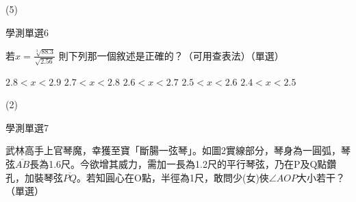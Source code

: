 \begin{QUESTIONS}
\begin{QUESTION}
        \begin{QANS}
            (5)
        \end{QANS}
        \begin{QSOLLIST}
        \end{QSOLLIST}
        \begin{QEMPTYSPACE}
        \end{QEMPTYSPACE}
    \end{QUESTION}
    \begin{QUESTION}
        \begin{ExamInfo}{83}{學測}{單選}{6}
        \end{ExamInfo}
        \begin{ExamAnsRateInfo}{}{}{}{}
        \end{ExamAnsRateInfo}
        \begin{QBODY}
            若$ x=\frac{\sqrt[3]{88.3}}{\sqrt{2.56}}$ 則下列那一個敘述是正確的？（可用查表法）（單選）
            \begin{QOPS}
            \QOP $2.8<x<2.9$	
            \QOP $2.7<x<2.8$	
            \QOP $2.6<x<2.7$
            \QOP $2.5<x<2.6$	
            \QOP $2.4<x<2.5$ 
            \end{QOPS}        
        \end{QBODY}
        \begin{QFROMS}
        \end{QFROMS}
        \begin{QTAGS}\end{QTAGS}
        \begin{QANS}
            (2)
        \end{QANS}
        \begin{QSOLLIST}
        \end{QSOLLIST}
        \begin{QEMPTYSPACE}
        \end{QEMPTYSPACE}
    \end{QUESTION}
    \begin{QUESTION}
        \begin{ExamInfo}{83}{學測}{單選}{7}
        \end{ExamInfo}
        \begin{ExamAnsRateInfo}{}{}{}{}
        \end{ExamAnsRateInfo}
        \begin{QBODY}
            武林高手上官琴魔，幸獲至寶「斷腸一弦琴」。如圖2實線部分，琴身為一圓弧，琴弦$\overline{AB}$長為1.6尺。今欲增其威力，需加一長為1.2尺的平行琴弦，乃在P及Q點鑽孔，加裝琴弦$\overline{PQ}$。若知圓心在O點，半徑為1尺，敢問少(女)俠$\angle AOP$大小若干？（單選）

\end{QBODY}
\end{QUESTION}
\end{QUESTIONS}
